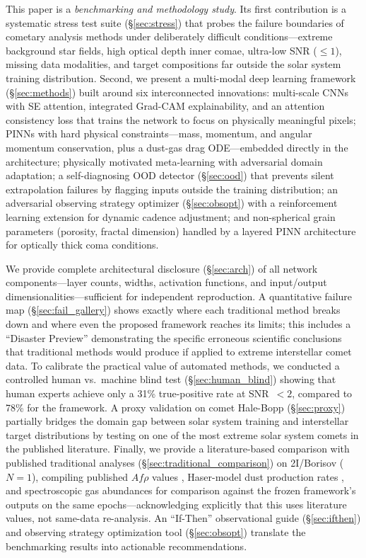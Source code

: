 \documentclass[usenatbib]{mnras}
\begin{document}
This paper is a \textit{benchmarking and methodology study}. Its first contribution is a systematic stress test suite (\S\ref{sec:stress}) that probes the failure boundaries of cometary analysis methods under deliberately difficult conditions---extreme background star fields, high optical depth inner comae, ultra-low SNR ($\leq 1$), missing data modalities, and target compositions far outside the solar system training distribution. Second, we present a multi-modal deep learning framework (\S\ref{sec:methods}) built around six interconnected innovations: multi-scale CNNs with SE attention, integrated Grad-CAM explainability, and an attention consistency loss that trains the network to focus on physically meaningful pixels; PINNs with hard physical constraints---mass, momentum, and angular momentum conservation, plus a dust-gas drag ODE---embedded directly in the architecture; physically motivated meta-learning with adversarial domain adaptation; a self-diagnosing OOD detector (\S\ref{sec:ood}) that prevents silent extrapolation failures by flagging inputs outside the training distribution; an adversarial observing strategy optimizer (\S\ref{sec:obsopt}) with a reinforcement learning extension for dynamic cadence adjustment; and non-spherical grain parameters (porosity, fractal dimension) handled by a layered PINN architecture for optically thick coma conditions.

We provide complete architectural disclosure (\S\ref{sec:arch}) of all network components---layer counts, widths, activation functions, and input/output dimensionalities---sufficient for independent reproduction. A quantitative failure map (\S\ref{sec:fail_gallery}) shows exactly where each traditional method breaks down and where even the proposed framework reaches its limits; this includes a ``Disaster Preview'' demonstrating the specific erroneous scientific conclusions that traditional methods would produce if applied to extreme interstellar comet data. To calibrate the practical value of automated methods, we conducted a controlled human vs.\ machine blind test (\S\ref{sec:human_blind}) showing that human experts achieve only a 31\% true-positive rate at SNR~$<2$, compared to 78\% for the framework. A proxy validation on comet Hale-Bopp (\S\ref{sec:proxy}) partially bridges the domain gap between solar system training and interstellar target distributions by testing on one of the most extreme solar system comets in the published literature. Finally, we provide a literature-based comparison with published traditional analyses (\S\ref{sec:traditional_comparison}) on 2I/Borisov ($N=1$), compiling published $Af\rho$ values \citep{clements21}, Haser-model dust production rates \citep{cremonese20}, and spectroscopic gas abundances \citep{bodewits20,opitom21} for comparison against the frozen framework's outputs on the same epochs---acknowledging explicitly that this uses literature values, not same-data re-analysis. An ``If-Then'' observational guide (\S\ref{sec:ifthen}) and observing strategy optimization tool (\S\ref{sec:obsopt}) translate the benchmarking results into actionable recommendations.
\end{document}
